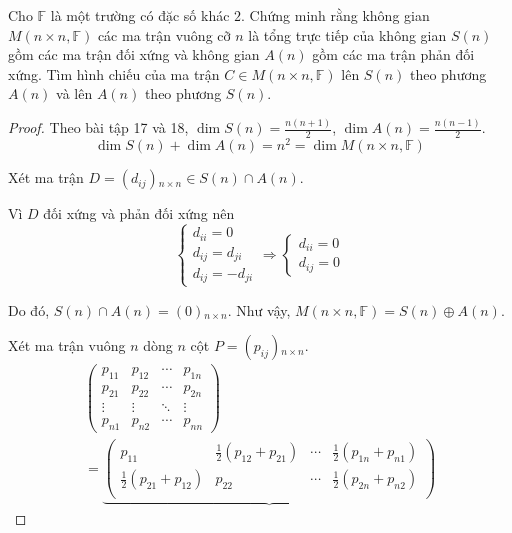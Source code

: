 \documentclass[class=linear-algebra,crop=false]{standalone}
\begin{document}
\begin{exercise}
    Cho $\mathbb{F}$ là một trường có đặc số khác $2$. Chứng minh rằng không gian $M(n\times n, \mathbb{F})$ các ma trận vuông cỡ $n$ là tổng trực tiếp của không gian $S(n)$ gồm các ma trận đối xứng và không gian $A(n)$ gồm các ma trận phản đối xứng. Tìm hình chiếu của ma trận $C\in M(n\times n, \mathbb{F})$ lên $S(n)$ theo phương $A(n)$ và lên $A(n)$ theo phương $S(n)$.
\end{exercise}

\begin{proof}
    Theo bài tập 17 và 18, $\dim S(n) = \frac{n(n+1)}{2}$, $\dim A(n) = \frac{n(n-1)}{2}$.
    \[ \dim S(n) + \dim A(n) = n^{2} = \dim M(n\times n,\mathbb{F}) \]
    \par Xét ma trận $D = (d_{ij}){}_{n\times n} \in S(n)\cap A(n)$.
    \par Vì $D$ đối xứng và phản đối xứng nên
    \[
        \begin{cases}
            d_{ii} = 0      \\
            d_{ij} = d_{ji} \\
            d_{ij} = - d_{ji}
        \end{cases}
        \Longrightarrow
        \begin{cases}
            d_{ii} = 0 \\
            d_{ij} = 0
        \end{cases}
    \]
    \par Do đó, $S(n) \cap A(n) = (0){}_{n\times n}$. Như vậy, $M(n\times n,\mathbb{F}) = S(n)\oplus A(n)$.
    \par Xét ma trận vuông $n$ dòng $n$ cột $P = (p_{ij}){}_{n\times n}$.
    \begin{gather*}
        \begin{pmatrix}
            p_{11} & p_{12} & \cdots & p_{1n} \\
            p_{21} & p_{22} & \cdots & p_{2n} \\
            \vdots & \vdots & \ddots & \vdots \\
            p_{n1} & p_{n2} & \cdots & p_{nn}
        \end{pmatrix} \\
        =
        \underbrace{
            \begin{pmatrix}
                p_{11}                       & \frac{1}{2}(p_{12} + p_{21}) & \cdots & \frac{1}{2}(p_{1n} + p_{n1}) \\
                \frac{1}{2}(p_{21} + p_{12}) & p_{22}                       & \cdots & \frac{1}{2}(p_{2n} + p_{n2}) \\

\end{pmatrix}}
\end{gather*}
\end{proof}
\end{document}
